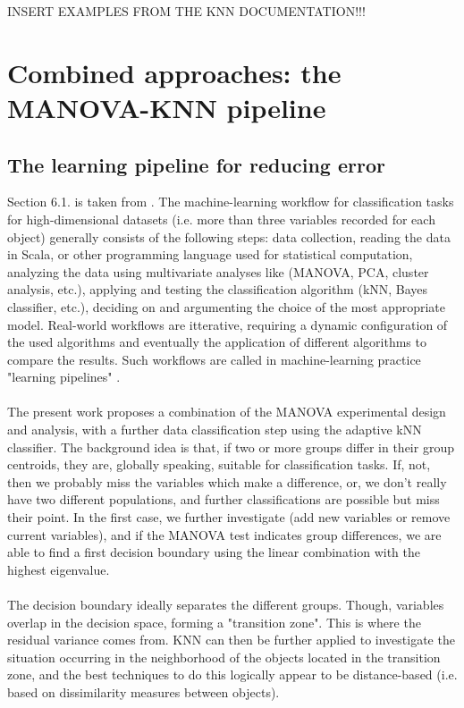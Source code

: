 \documentclass {article}
\begin{document}
INSERT EXAMPLES FROM THE KNN DOCUMENTATION!!! 

\section {Combined approaches: the MANOVA-KNN pipeline}

\subsection{The learning pipeline for reducing error}

Section 6.1. is taken from \cite{tesileanu_geostatistics_2017}. The machine-learning workflow for classification tasks for high-dimensional datasets (i.e. more than three variables recorded for each object) generally consists of the following steps: data collection, reading the data in Scala, or other programming language used for statistical computation, analyzing the data using multivariate analyses like (MANOVA, PCA, cluster analysis, etc.), applying and testing the classification algorithm (kNN, Bayes classifier, etc.), deciding on and argumenting the choice of the most appropriate model. 
 Real-world workflows are itterative, requiring a dynamic configuration of the used algorithms and eventually the application of different algorithms to compare the results.
 Such workflows are called in machine-learning practice "learning pipelines" \cite{karau_learning_2015}.
\\
\\
The present work proposes a combination of the MANOVA experimental design and analysis, with a further data classification step using the adaptive kNN classifier. 
The background idea is that, if two or more groups differ in their group centroids, they are, globally speaking, suitable for classification tasks. If, not, then we probably miss the variables which make a difference, or, we don't really have two different populations, and further classifications are possible but miss their point.
In the first case, we further investigate (add new variables or remove current variables), and if the MANOVA test indicates group differences, we are able to find a first decision boundary using the linear combination with the highest eigenvalue.
\\
\\
 The decision boundary ideally separates the different groups.
 Though, variables overlap in the decision space, forming a "transition zone". This is where the residual variance comes from. 
KNN can then be further applied to investigate the situation occurring in the neighborhood of the objects located in the transition zone, and the best techniques to do this logically appear to be distance-based (i.e. based on dissimilarity measures between objects). 
\end{document}
